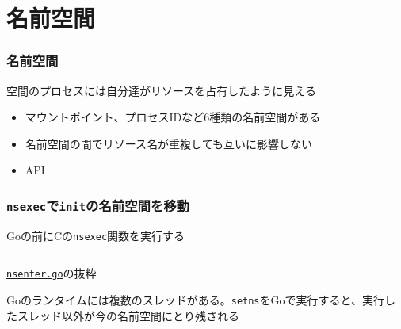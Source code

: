 \documentclass[unicode, 14pt, aspectratio=169]{beamer}
\begin{document}
\section{名前空間}
\begin{frame}
  \frametitle{名前空間\supercite{namespaces}}
  空間のプロセスには自分達がリソースを占有したように見える
  \begin{itemize}[leftmargin=0.8cm,label=$\circ$]
    \item マウントポイント、プロセスIDなど6種類の名前空間がある
    \item 名前空間の間でリソース名が重複しても互いに影響しない
    \item API
    \end{itemize}
\end{frame}
\begin{frame}
  \frametitle{\texttt{nsexec}で\texttt{init}の名前空間を移動}
  Goの前にCの\texttt{nsexec}関数を実行する
  \begin{center}
    \inputminted{go}{code/nsenter.go}
    \href{https://github.com/opencontainers/runc/blob/7cb363254b69e10320360b63fb73e0ffb5da7bf2/libcontainer/nsenter/nsenter.go\#L12}{\texttt{nsenter.go}}の抜粋
  \end{center}
  Goのランタイムには複数のスレッドがある\supercite{runc}。\texttt{setns}をGoで実行すると、実行したスレッド以外が今の名前空間にとり残される
\end{frame}
\end{document}
